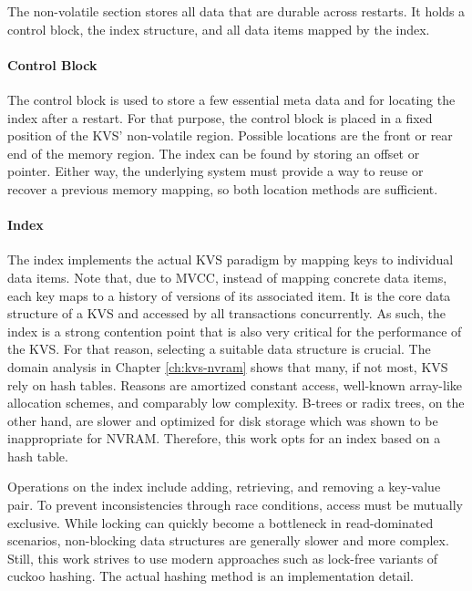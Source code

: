 
The non-volatile section stores all data that are durable across restarts. It
holds a control block, the index structure, and all data items mapped by the
index.

\paragraph{Control Block}

The control block is used to store a few essential meta data and for locating
the index after a restart. For that purpose, the control block is placed in a
fixed position of the KVS' non-volatile region. Possible locations are the front
or rear end of the memory region. The index can be found by storing an offset or
pointer. Either way, the underlying system must provide a way to reuse or
recover a previous memory mapping, so both location methods are sufficient.

\paragraph{Index}

The index implements the actual KVS paradigm by mapping keys to individual data
items. Note that, due to MVCC, instead of mapping concrete data items, each key
maps to a history of versions of its associated item. It is the core data
structure of a KVS and accessed by all transactions concurrently. As such, the
index is a strong contention point that is also very critical for the
performance of the KVS. For that reason, selecting a suitable data structure is
crucial. The domain analysis in Chapter \ref{ch:kvs-nvram} shows that many, if
not most, KVS rely on hash tables. Reasons are amortized constant access,
well-known array-like allocation schemes, and comparably low complexity. B-trees
or radix trees, on the other hand, are slower and optimized for disk storage
which was shown to be inappropriate for NVRAM. Therefore, this work opts for an
index based on a hash table.

Operations on the index include adding, retrieving, and removing a key-value
pair. To prevent inconsistencies through race conditions, access must be
mutually exclusive. While locking can quickly become a bottleneck in
read-dominated scenarios, non-blocking data structures are generally slower and
more complex. Still, this work strives to use modern approaches such as
lock-free variants of cuckoo hashing. The actual hashing method is an
implementation detail.

